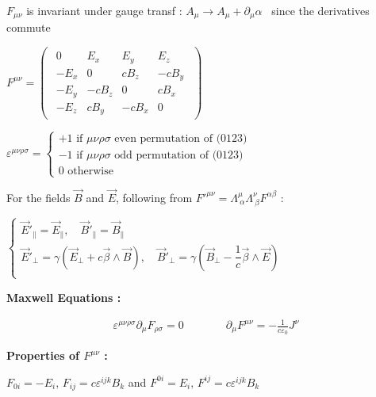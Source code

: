 \item $F_{\mu\nu}$ is invariant under gauge transf : $A_{\mu} \rightarrow A_{\mu} + \partial_{\mu}\alpha $ \, since the derivatives commute

\item $F^{\mu\nu}=\begin{pmatrix}
\begin{array}{cccc}
0 & E_x & E_y & E_z \\ 
-E_x & 0 & c B_z & -c B_y \\ 
-E_y & -cB_z  & 0 & c B_x \\ 
-E_z &  cB_y& -cB_x & 0
\end{array} 
\end{pmatrix}$

\item $\varepsilon^{\mu\nu\rho\sigma} = 
\begin{cases}
+1 \, \, \text{if $\mu\nu\rho\sigma$ even permutation of (0123)}  \\
-1 \, \, \text{if $\mu\nu\rho\sigma$ odd permutation of (0123)} \\
0 \, \, \text{otherwise}	
\end{cases}$
\item For the fields $\vec{B}$ and $\vec{E}$, following from $F'^{\mu\nu}=\Lambda^\mu_{\ \alpha}\Lambda^\nu_{\ \beta} F^{\alpha\beta}$ : 
\item $\begin{cases}
\vec{E}'_{\parallel} = \vec{E}_{\parallel}, \quad \vec{B}'_{\parallel} = \vec{B}_{\parallel} \\
\vec{E}'_{\perp} = \gamma(\vec{E}_{\perp} + c \vec{\beta}\wedge \vec{B}), \quad \vec{B}'_{\perp} = \gamma(\vec{B}_{\perp} - \dfrac{1}{c}\vec{\beta} \wedge \vec{E} )\\
\end{cases}$
\item[] \textbf{Maxwell Equations :}

$$\boxed{\begin{split}
	\varepsilon^{\mu \nu \rho \sigma}\partial_\mu F_{\rho \sigma}=0  \qquad \quad & \partial_\mu F^{\mu\nu}=-\frac{1}{c\varepsilon_0}J^\nu 
	\end{split}}$$

\item \textbf{Properties of $F^{\mu\nu} $ :} 

\item $F_{0i} = -E_i, \,  F_{ij} =  c \varepsilon^{ijk}B_k$ and $F^{0i} = E_i, \, F^{ij} = c\varepsilon^{ijk}B_k$

